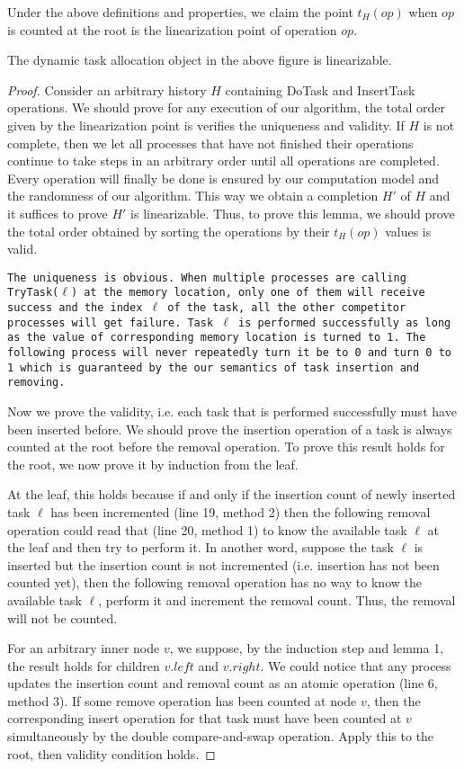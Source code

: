 Under the above definitions and properties, we claim the point $t_H(op)$ when $op$ is counted at the root is the linearization point of operation $op$.

\begin{lem}
The dynamic task allocation object in the above figure is linearizable.
\end{lem}
\begin{proof}
Consider an arbitrary history $H$ containing DoTask and InsertTask operations. We should prove for any execution of our algorithm, the total order given by the linearization point is verifies the uniqueness and validity. If $H$ is not complete, then we let all processes that have not finished their operations continue to take steps in an arbitrary order until all operations are completed. Every operation will finally be done is ensured by our computation model and the randomness of our algorithm. This way we obtain a completion $H'$ of $H$ and it suffices to prove $H'$ is linearizable. Thus, to prove this lemma, we should prove the total order obtained by sorting the operations by their $t_H(op)$ values is valid.

\texttt{The uniqueness is obvious. When multiple processes are calling TryTask($\ell$) at the memory location, only one of them will receive success and the index $\ell$ of the task, all the other competitor processes will get failure. Task $\ell$ is performed successfully as long as the value of corresponding memory location is turned to 1. The following process will never repeatedly turn it be to 0 and turn 0 to 1 which is guaranteed by the our semantics of task insertion and removing.}

Now we prove the validity, i.e. each task that is performed successfully must have been inserted before. We should prove the insertion operation of a task is always counted at the root before the removal operation. To prove this result holds for the root, we now prove it by induction from the leaf.

At the leaf, this holds because if and only if the insertion count of newly inserted task $\ell$ has been incremented (line 19, method 2) then the following removal operation could read that (line 20, method 1) to know the available task $\ell$ at the leaf and then try to perform it. In another word, suppose the task $\ell$ is inserted but the insertion count is not incremented (i.e. insertion has not been counted yet), then the following removal operation has no way to know the available task $\ell$, perform it and increment the removal count. Thus, the removal will not be counted.

For an arbitrary inner node $v$, we suppose, by the induction step and lemma 1, the result holds for children $v.left$ and $v.right$. We could notice that any process updates the insertion count and removal count as an atomic operation (line 6, method 3). If some remove operation has been counted at node $v$, then the corresponding insert operation for that task must have been counted at $v$ simultaneously by the double compare-and-swap operation. Apply this to the root, then validity condition holds.
\end{proof}
